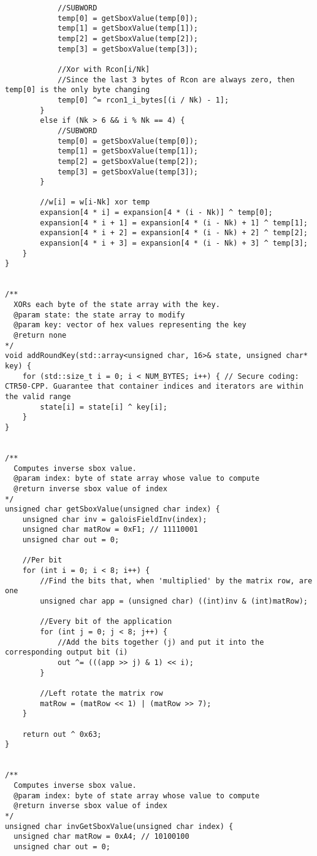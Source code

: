 \documentclass[a4paper,12pt]{article}
\begin{document}
{\begin{lstlisting}
			//SUBWORD
			temp[0] = getSboxValue(temp[0]);
			temp[1] = getSboxValue(temp[1]);
			temp[2] = getSboxValue(temp[2]);
			temp[3] = getSboxValue(temp[3]);

			//Xor with Rcon[i/Nk]
			//Since the last 3 bytes of Rcon are always zero, then temp[0] is the only byte changing
			temp[0] ^= rcon1_i_bytes[(i / Nk) - 1];
		}
		else if (Nk > 6 && i % Nk == 4) {
			//SUBWORD
			temp[0] = getSboxValue(temp[0]);
			temp[1] = getSboxValue(temp[1]);
			temp[2] = getSboxValue(temp[2]);
			temp[3] = getSboxValue(temp[3]);
		}

		//w[i] = w[i-Nk] xor temp
		expansion[4 * i] = expansion[4 * (i - Nk)] ^ temp[0];
		expansion[4 * i + 1] = expansion[4 * (i - Nk) + 1] ^ temp[1];
		expansion[4 * i + 2] = expansion[4 * (i - Nk) + 2] ^ temp[2];
		expansion[4 * i + 3] = expansion[4 * (i - Nk) + 3] ^ temp[3];
	}
}


/**
  XORs each byte of the state array with the key.
  @param state: the state array to modify
  @param key: vector of hex values representing the key
  @return none
*/
void addRoundKey(std::array<unsigned char, 16>& state, unsigned char* key) {
	for (std::size_t i = 0; i < NUM_BYTES; i++) { // Secure coding: CTR50-CPP. Guarantee that container indices and iterators are within the valid range
		state[i] = state[i] ^ key[i];
	}
}


/**
  Computes inverse sbox value.
  @param index: byte of state array whose value to compute
  @return inverse sbox value of index
*/
unsigned char getSboxValue(unsigned char index) {
	unsigned char inv = galoisFieldInv(index);
	unsigned char matRow = 0xF1; // 11110001
	unsigned char out = 0;
	
	//Per bit
	for (int i = 0; i < 8; i++) {
		//Find the bits that, when 'multiplied' by the matrix row, are one
		unsigned char app = (unsigned char) ((int)inv & (int)matRow);

		//Every bit of the application
		for (int j = 0; j < 8; j++) {
			//Add the bits together (j) and put it into the corresponding output bit (i)
			out ^= (((app >> j) & 1) << i);
		}

		//Left rotate the matrix row
		matRow = (matRow << 1) | (matRow >> 7);
	}

	return out ^ 0x63;
}


/**
  Computes inverse sbox value.
  @param index: byte of state array whose value to compute
  @return inverse sbox value of index
*/
unsigned char invGetSboxValue(unsigned char index) {
  unsigned char matRow = 0xA4; // 10100100
  unsigned char out = 0;


\end{lstlisting}}
\end{document}
